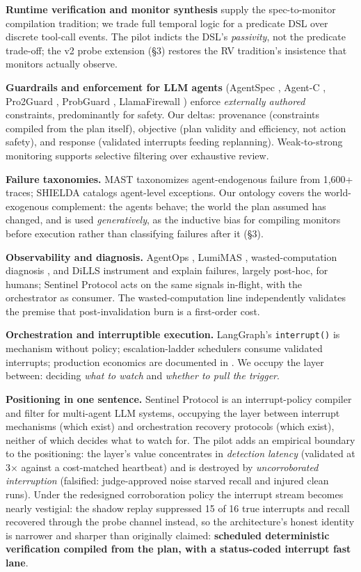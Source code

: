 \documentclass[acmsmall,screen,review,anonymous]{acmart}
\begin{document}
\textbf{Runtime verification and monitor synthesis} \cite{ref4, ref5} supply the spec-to-monitor compilation tradition; we trade full temporal logic for a predicate DSL over discrete tool-call events. The pilot indicts the DSL's \emph{passivity}, not the predicate trade-off; the v2 probe extension (\S3) restores the RV tradition's insistence that monitors actually observe.

\textbf{Guardrails and enforcement for LLM agents} (AgentSpec \cite{ref9}, Agent-C \cite{ref10}, Pro2Guard \cite{ref11}, ProbGuard \cite{ref12}, LlamaFirewall \cite{ref13}) enforce \emph{externally authored} constraints, predominantly for safety. Our deltas: provenance (constraints compiled from the plan itself), objective (plan validity and efficiency, not action safety), and response (validated interrupts feeding replanning). Weak-to-strong monitoring \cite{ref8} supports selective filtering over exhaustive review.

\textbf{Failure taxonomies.} MAST \cite{ref14} taxonomizes agent-endogenous failure from 1,600+ traces; SHIELDA \cite{ref20} catalogs agent-level exceptions. Our ontology covers the world-exogenous complement: the agents behave; the world the plan assumed has changed, and is used \emph{generatively}, as the inductive bias for compiling monitors before execution rather than classifying failures after it (\S3).

\textbf{Observability and diagnosis.} AgentOps \cite{ref15}, LumiMAS \cite{ref17}, wasted-computation diagnosis \cite{ref16}, and DiLLS \cite{ref18} instrument and explain failures, largely post-hoc, for humans; Sentinel Protocol acts on the same signals in-flight, with the orchestrator as consumer. The wasted-computation line independently validates the premise that post-invalidation burn is a first-order cost.

\textbf{Orchestration and interruptible execution.} LangGraph's \texttt{interrupt()} \cite{ref22} is mechanism without policy; escalation-ladder schedulers \cite{ref19} consume validated interrupts; production economics are documented in \cite{ref27}. We occupy the layer between: deciding \emph{what to watch} and \emph{whether to pull the trigger}.

\textbf{Positioning in one sentence.} Sentinel Protocol is an interrupt-policy compiler and filter for multi-agent LLM systems, occupying the layer between interrupt mechanisms (which exist) and orchestration recovery protocols (which exist), neither of which decides what to watch for. The pilot adds an empirical boundary to the positioning: the layer's value concentrates in \emph{detection latency} (validated at 3$\times$ against a cost-matched heartbeat) and is destroyed by \emph{uncorroborated interruption} (falsified: judge-approved noise starved recall and injured clean runs). Under the redesigned corroboration policy the interrupt stream becomes nearly vestigial: the shadow replay suppressed 15 of 16 true interrupts and recall recovered through the probe channel instead, so the architecture's honest identity is narrower and sharper than originally claimed: \textbf{scheduled deterministic verification compiled from the plan, with a status-coded interrupt fast lane}.
\end{document}
